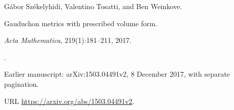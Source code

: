 G\'abor Sz\'ekelyhidi, Valentino Tosatti, and Ben Weinkove.

\newblock Gauduchon metrics with prescribed volume form.

\newblock \emph{Acta Mathematica}, 219(1):181--211, 2017.

\newblock {}.

\newblock Earlier manuscript: arXiv:1503.04491v2, 8 December 2017, with separate pagination.

\newblock URL \url{https://arxiv.org/abs/1503.04491v2}.
